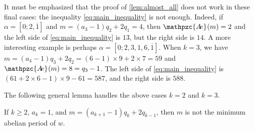 \documentclass[a4paper,fleqn]{article}
\newcommand{\abexp}[2][]{\mathpzc{A\mkern-3mu e}_{#1}(#2)}
\begin{document}
  It must be emphasized that the proof of \autoref{lem:almost_all} does not work in these final cases: the inequality
  \eqref{eq:main_inequality} is not enough. Indeed, if $\alpha = [0; 2, \overline{1}]$ and
  $m = (a_3 - 1)q_2 + 2q_1 = 4$, then $\abexp{m} = 2$ and the left side of \eqref{eq:main_inequality} is $13$, but the
  right side is $14$. A more interesting example is perhaps $\alpha = [0; 2, 3, 1, 6, \overline{1}]$. When $k = 3$, we
  have $m = (a_4 - 1)q_3 + 2q_2 = (6 - 1) \times 9 + 2 \times 7 = 59$ and $\abexp{m} = 8 = q_3 - 1$. The left side of
  \eqref{eq:main_inequality} is $(61 + 2 \times 6 - 1) \times 9 - 61 = 587$, and the right side is $588$.

  The following general lemma handles the above cases $k = 2$ and $k = 3$.

  \begin{lemma}\label{lem:cases_2_3}
    If $k \geq 2$, $a_k = 1$, and $m = (a_{k+1} - 1)q_k + 2q_{k-1}$, then $m$ is not the minimum abelian period of $w$.
  \end{lemma}
\end{document}
